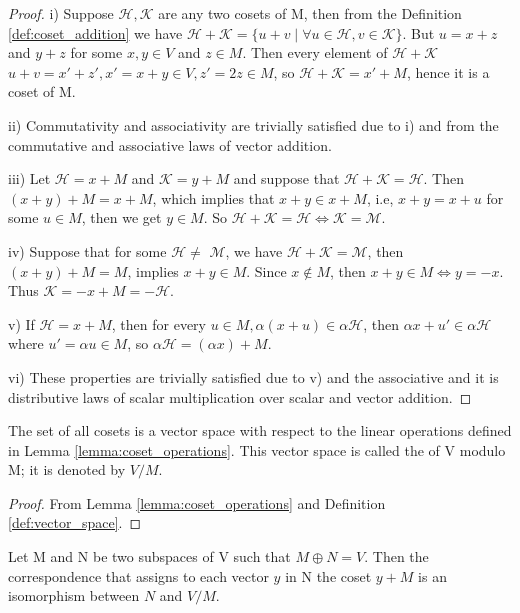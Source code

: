 \documentclass[10pt,a4paper]{article}
\begin{document}
\begin{proof}
    i) Suppose $\mathcal{H},\mathcal{K}$ are any two cosets of M, then from the Definition \ref{def:coset_addition} we have $\mathcal{H+K}=\{u+v\;|\;\forall u\in \mathcal{H}, v\in \mathcal{K}\}$. But $u=x+z$ and $y+z$ for some $x,y\in V$ and $z\in M$. Then every element of $\mathcal{H+K}$ $u+v=x'+z',x'=x+y\in V,z'=2z\in M$, so $\mathcal{H+K}=x'+M$, hence it is a coset of M.

    ii) Commutativity and associativity are trivially satisfied due to i) and from the commutative and associative laws of vector addition.
    
    iii) Let $\mathcal{H}=x+M$ and $\mathcal{K}=y+M$ and suppose that $\mathcal{H+K}=\mathcal{H}$. Then $(x+y)+M=x+M$, which implies that $x+y\in x+M$, i.e, $x+y=x+u$ for some $u\in M$, then we get $y\in M$. So $\mathcal{H+K}=\mathcal{H}\Leftrightarrow \mathcal{K}=\mathcal{M}$.

    iv) Suppose that for some $\mathcal{H}\neq$ $\mathcal{M}$, we have $\mathcal{H+K=M}$, then $(x+y)+M=M$, implies $x+y\in M$. Since $x\notin M$, then $x+y\in M \Leftrightarrow y=-x$. Thus $\mathcal{K}=-x+M=\mathcal{-H}$. 

    v) If $\mathcal{H}=x+M$, then for every $u\in M, \alpha(x+u)\in \alpha \mathcal{H}$, then $\alpha x+u'\in \alpha \mathcal{H}$ where $u'=\alpha u\in  M$, so $\alpha \mathcal{H}=(\alpha x)+M$.

    vi) These properties are trivially satisfied due to v) and the  associative and it is distributive laws of scalar multiplication over scalar and vector addition.
\end{proof}

\begin{theorem}\label{def:quotient_space}
    The set of all cosets is a vector space with respect to the linear operations defined in Lemma \ref{lemma:coset_operations}. This vector space is called the  of V modulo M; it is denoted by $V/M$.
\end{theorem}

\begin{proof}
    From Lemma \ref{lemma:coset_operations} and Definition \ref{def:vector_space}.
\end{proof}

\begin{theorem}\label{thm:quotient_space}
    Let M and N be two subspaces of V such that $M\oplus N=V$. Then the correspondence that assigns to each vector $y$ in N the coset $y+M$ is an isomorphism between $N$ and $V/M$.
\end{theorem}
\end{document}

